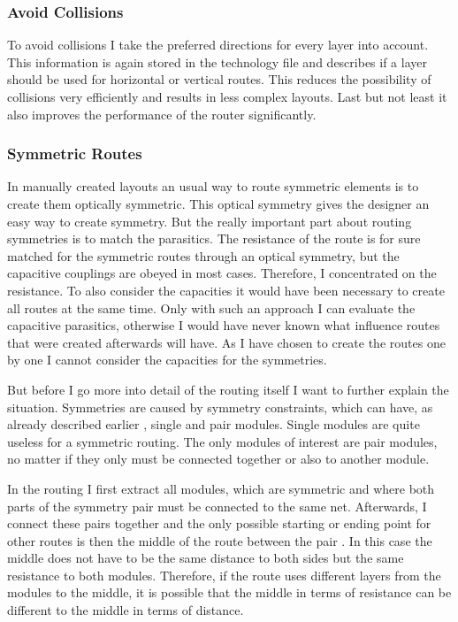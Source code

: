 \subsubsection{Avoid Collisions}
To avoid collisions I take the preferred directions for every layer into account. This information is again stored in the technology file and describes if a layer should be used for horizontal or vertical routes. This reduces the possibility of collisions very efficiently and results in less complex layouts. Last but not least it also improves the performance of the router significantly.

\subsubsection{Symmetric Routes}
In manually created layouts an usual way to route symmetric elements is to create them optically symmetric. This optical symmetry gives the designer an easy way to create symmetry. But the really important part about routing symmetries is to match the parasitics. The resistance of the route is for sure matched for the symmetric routes through an optical symmetry, but the capacitive couplings are obeyed in most cases. Therefore, I concentrated on the resistance. To also consider the capacities it would have been necessary to create all routes at the same time. Only with such an approach I can evaluate the capacitive parasitics, otherwise I would have never known what influence routes that were created afterwards will have. As I have chosen to create the routes one by one I cannot consider the capacities for the symmetries.

But before I go more into detail of the routing itself I want to further explain the situation. Symmetries are caused by symmetry constraints, which can have, as already described earlier , single and pair modules. Single modules are quite useless for a symmetric routing. The only modules of interest are pair modules, no matter if they only must be connected together or also to another module.

In the routing I first extract all modules, which are symmetric and where both parts of the symmetry pair must be connected to the same net. Afterwards, I connect these pairs together and the only possible starting or ending point for other routes is then the middle of the route between the pair . In this case the middle does not have to be the same distance to both sides but the same resistance to both modules. Therefore, if the route uses different layers from the modules to the middle, it is possible that the middle in terms of resistance can be different to the middle in terms of distance.

